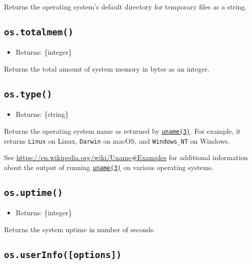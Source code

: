 Returns the operating system's default directory for temporary files as
a string.

\subsection{\texorpdfstring{\texttt{os.totalmem()}}{os.totalmem()}}\label{os.totalmem}

\begin{itemize}
\tightlist
\item
  Returns: \{integer\}
\end{itemize}

Returns the total amount of system memory in bytes as an integer.

\subsection{\texorpdfstring{\texttt{os.type()}}{os.type()}}\label{os.type}

\begin{itemize}
\tightlist
\item
  Returns: \{string\}
\end{itemize}

Returns the operating system name as returned by
\href{https://linux.die.net/man/3/uname}{\texttt{uname(3)}}. For
example, it returns \texttt{\textquotesingle{}Linux\textquotesingle{}}
on Linux, \texttt{\textquotesingle{}Darwin\textquotesingle{}} on macOS,
and \texttt{\textquotesingle{}Windows\_NT\textquotesingle{}} on Windows.

See \url{https://en.wikipedia.org/wiki/Uname\#Examples} for additional
information about the output of running
\href{https://linux.die.net/man/3/uname}{\texttt{uname(3)}} on various
operating systems.

\subsection{\texorpdfstring{\texttt{os.uptime()}}{os.uptime()}}\label{os.uptime}

\begin{itemize}
\tightlist
\item
  Returns: \{integer\}
\end{itemize}

Returns the system uptime in number of seconds.

\subsection{\texorpdfstring{\texttt{os.userInfo({[}options{]})}}{os.userInfo({[}options{]})}}\label{os.userinfooptions}

